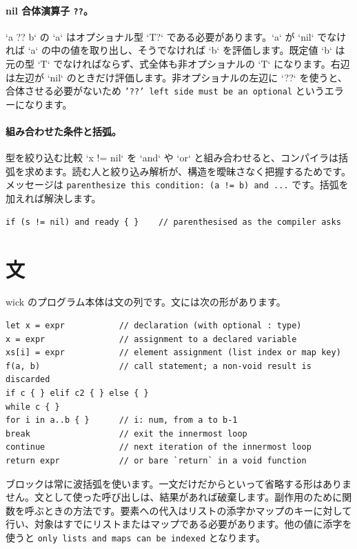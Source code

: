 \paragraph{nil 合体演算子 \texttt{??}。} `a ?? b` の `a` はオプショナル型 `T?` である必要があります。`a` が `nil` でなければ `a` の中の値を取り出し、そうでなければ `b` を評価します。既定値 `b` は元の型 `T` でなければならず、式全体も非オプショナルの `T` になります。右辺は左辺が `nil` のときだけ評価します。非オプショナルの左辺に `??` を使うと、合体させる必要がないため \texttt{'??' left side must be an optional} というエラーになります。

\paragraph{組み合わせた条件と括弧。} 型を絞り込む比較 `x != nil` を `and` や `or` と組み合わせると、コンパイラは括弧を求めます。読む人と絞り込み解析が、構造を曖昧さなく把握するためです。メッセージは \texttt{parenthesize this condition: (a != b) and ...} です。括弧を加えれば解決します。

\begin{lstlisting}[language=wick]
if (s != nil) and ready { }    // parenthesised as the compiler asks
\end{lstlisting}

\section{文}

wick のプログラム本体は文の列です。文には次の形があります。

\begin{lstlisting}[language=wick]
let x = expr           // declaration (with optional : type)
x = expr               // assignment to a declared variable
xs[i] = expr           // element assignment (list index or map key)
f(a, b)                // call statement; a non-void result is discarded
if c { } elif c2 { } else { }
while c { }
for i in a..b { }      // i: num, from a to b-1
break                  // exit the innermost loop
continue               // next iteration of the innermost loop
return expr            // or bare `return` in a void function
\end{lstlisting}

\noindent
ブロックは常に波括弧を使います。一文だけだからといって省略する形はありません。文として使った呼び出しは、結果があれば破棄します。副作用のために関数を呼ぶときの方法です。要素への代入はリストの添字かマップのキーに対して行い、対象はすでにリストまたはマップである必要があります。他の値に添字を使うと \texttt{only lists and maps can be indexed} となります。

